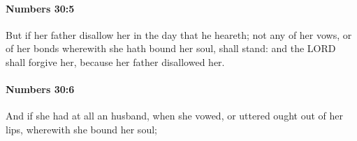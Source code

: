 		\paragraph{Numbers 30:5} %
			\label{NUMBERS-30-5}

			But if her father disallow her in the day that he heareth; not any of her vows, or of her bonds wherewith she hath bound her soul, shall stand: and the LORD shall forgive her, because her father disallowed her.


		\paragraph{Numbers 30:6} %
			\label{NUMBERS-30-6}

			And if she had at all an husband, when she vowed, or uttered ought out of her lips, wherewith she bound her soul;



